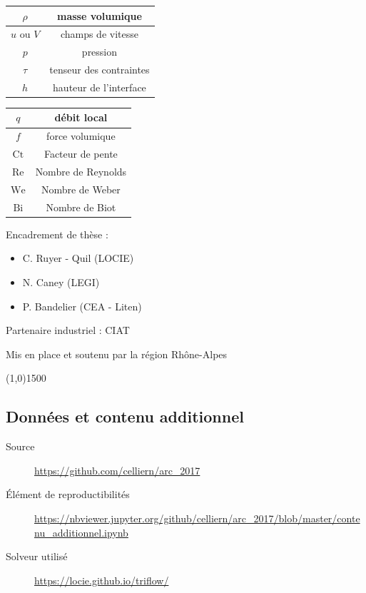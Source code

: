 \documentclass[a0,portrait]{a0poster}
\begin{document}
\begin{multicols}{2}
    \begin{center}
        \begin{tabular}{|c|c|}
            \hline $\rho$ & masse volumique \\
            \hline $u$ ou $V$ & champs de vitesse \\
            \hline $p$ & pression \\
            \hline $\tau$ & tenseur des contraintes \\
            \hline $h$ & hauteur de l'interface \\
            \hline
        \end{tabular}
        \begin{tabular}{|c|c|}
            \hline $q$ & débit local \\
            \hline $f$ & force volumique \\
            \hline $\mathrm{Ct}$ & Facteur de pente \\
            \hline $\mathrm{Re}$ & Nombre de Reynolds \\
            \hline $\mathrm{W\!e}$ & Nombre de Weber \\
            \hline $\mathrm{Bi}$ & Nombre de Biot \\
            \hline
        \end{tabular}
    \end{center}

        Encadrement de thèse :
        \begin{itemize}
            \item C. Ruyer - Quil (LOCIE)
            \item N. Caney (LEGI)
            \item P. Bandelier (CEA - Liten)
        \end{itemize}

        Partenaire industriel : CIAT

        Mis en place et soutenu par la région Rhône-Alpes
\end{multicols}

\begin{center}
    \line(1,0){1500}
\end{center}

\subsection*{Données et contenu additionnel}
\begin{description}
    \item[Source] \url{https://github.com/celliern/arc_2017}
    \item[Élément de reproductibilités] \url{https://nbviewer.jupyter.org/github/celliern/arc_2017/blob/master/contenu_additionnel.ipynb}
    \item[Solveur utilisé] \url{https://locie.github.io/triflow/}
\end{description}
\end{document}
